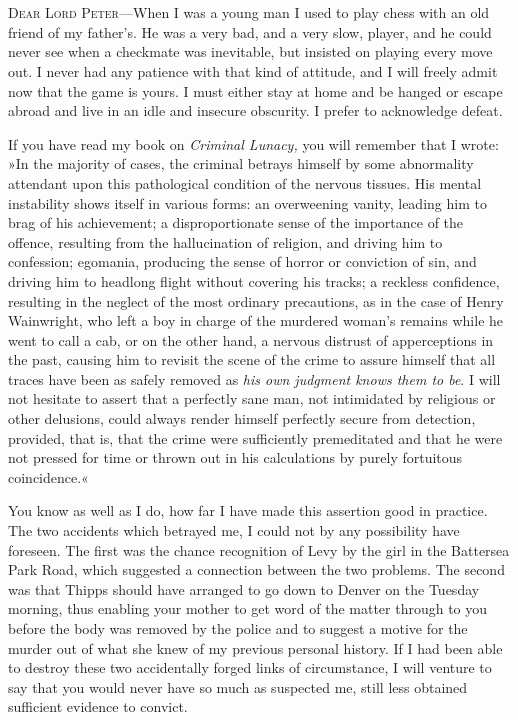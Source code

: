 \chapter[Chapter \thechapter]{}
\lettrine[lines=4]{D}{ear} \textsc{Lord Peter}—When I was a young man I used to play chess with an old friend of my father's. He was a very bad, and a very slow, player, and he could never see when a checkmate was inevitable, but insisted on playing every move out. I never had any patience with that kind of attitude, and I will freely admit now that the game is yours. I must either stay at home and be hanged or escape abroad and live in an idle and insecure obscurity. I prefer to acknowledge defeat.

If you have read my book on \textit{Criminal Lunacy,} you will remember that I wrote: »In the majority of cases, the criminal betrays himself by some abnormality attendant upon this pathological condition of the nervous tissues. His mental instability shows itself in various forms: an overweening vanity, leading him to brag of his achievement; a disproportionate sense of the importance of the offence, resulting from the hallucination of religion, and driving him to confession; egomania, producing the sense of horror or conviction of sin, and driving him to headlong flight without covering his tracks; a reckless confidence, resulting in the neglect of the most ordinary precautions, as in the case of Henry Wainwright, who left a boy in charge of the murdered woman's remains while he went to call a cab, or on the other hand, a nervous distrust of apperceptions in the past, causing him to revisit the scene of the crime to assure himself that all traces have been as safely removed as \textit{his own judgment knows them to be}. I will not hesitate to assert that a perfectly sane man, not intimidated by religious or other delusions, could always render himself perfectly secure from detection, provided, that is, that the crime were sufficiently premeditated and that he were not pressed for time or thrown out in his calculations by purely fortuitous coincidence.«

You know as well as I do, how far I have made this assertion good in practice. The two accidents which betrayed me, I could not by any possibility have foreseen. The first was the chance recognition of Levy by the girl in the Battersea Park Road, which suggested a connection between the two problems. The second was that Thipps should have arranged to go down to Denver on the Tuesday morning, thus enabling your mother to get word of the matter through to you before the body was removed by the police and to suggest a motive for the murder out of what she knew of my previous personal history. If I had been able to destroy these two accidentally forged links of circumstance, I will venture to say that you would never have so much as suspected me, still less obtained sufficient evidence to convict.

